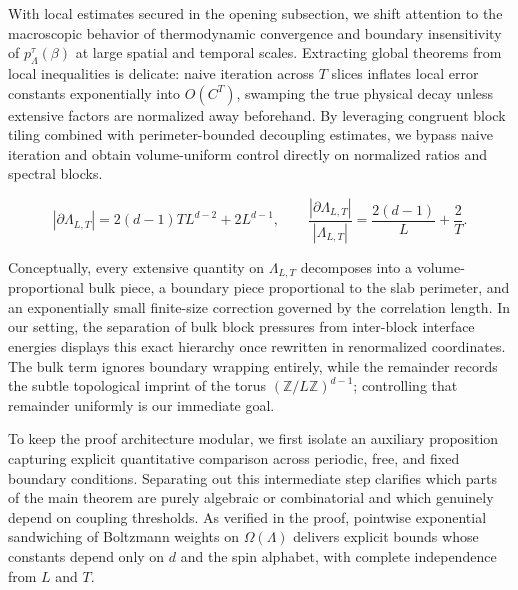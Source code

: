 \documentclass[11pt]{article}
\theoremstyle{definition}
\begin{document}
With local estimates secured in the opening subsection, we shift attention to the
macroscopic behavior of thermodynamic convergence and boundary insensitivity of
$p_\Lambda^\tau(\beta)$ at large spatial and temporal scales. Extracting global
theorems from local inequalities is delicate: naive iteration across $T$ slices
inflates local error constants exponentially into $O(C^T)$, swamping the true
physical decay unless extensive factors are normalized away beforehand. By
leveraging congruent block tiling combined with perimeter-bounded decoupling
estimates, we bypass naive iteration and obtain volume-uniform control directly on
normalized ratios and spectral blocks.

\[
  |\partial \Lambda_{L,T}| = 2(d-1) T L^{d-2} + 2 L^{d-1}, \qquad \frac{|\partial \Lambda_{L,T}|}{|\Lambda_{L,T}|} = \frac{2(d-1)}{L} + \frac{2}{T}.
\]

Conceptually, every extensive quantity on $\Lambda_{L,T}$ decomposes into a
volume-proportional bulk piece, a boundary piece proportional to the slab perimeter,
and an exponentially small finite-size correction governed by the correlation
length. In our setting, the separation of bulk block pressures from inter-block
interface energies displays this exact hierarchy once rewritten in renormalized
coordinates. The bulk term ignores boundary wrapping entirely, while the remainder
records the subtle topological imprint of the torus
$(\mathbb{Z}/L\mathbb{Z})^{d-1}$; controlling that remainder uniformly is our
immediate goal.

To keep the proof architecture modular, we first isolate an auxiliary proposition
capturing explicit quantitative comparison across periodic, free, and fixed boundary
conditions. Separating out this intermediate step clarifies which parts of the main
theorem are purely algebraic or combinatorial and which genuinely depend on coupling
thresholds. As verified in the proof, pointwise exponential sandwiching of Boltzmann
weights on $\Omega(\Lambda)$ delivers explicit bounds whose constants depend only on
$d$ and the spin alphabet, with complete independence from $L$ and $T$.
\end{document}
